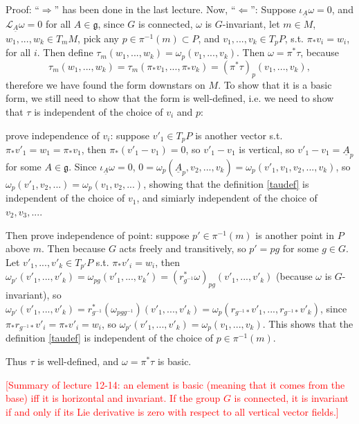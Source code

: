 \documentclass{article}
\theoremstyle{mystyle}
\theoremstyle{remark}
\numberwithin{equation}{section}
\begin{document}
Proof: ``$\Rightarrow$'' has been done in the last lecture. Now, ``$\Leftarrow$'': Suppose $\iota_{\underline{A}} \omega =0$, and $\mathcal{L}_{\underline{A}}\omega =0$ for all $A\in \mathfrak{g}$, since $G$ is connected, $\omega$ is $G$-invariant, let $m\in M$, $w_1,...,w_k \in T_mM$, pick any $p\in \pi^{-1}(m)\subset P$, and $v_1,...,v_k \in T_pP$, s.t. $\pi_*v_i = w_i$, for all $i$. Then define $\tau_m(w_1,...,w_k) =  \omega_p(v_1,...,v_k)$. Then $\omega = \pi^* \tau$, because 
\begin{equation}\label{taudef}
\tau_m(w_1,...,w_k) = \tau_m(\pi_*v_1,...,\pi_*v_k) = (\pi^*\tau)_p(v_1,...,v_k),
\end{equation}
therefore we have found the form downstars on $M$. To show that it is a basic form, we still need to show that the form is well-defined, i.e. we need to show that $\tau$ is independent of the choice of $v_i$ and $p$:

prove independence of $v_i$: suppose $v'_1 \in T_pP$ is another vector s.t. $\pi_*v'_1 = w_1 = \pi_*v_1$, then $ \pi_*(v'_1 - v_1) =0 $, so $v'_ 1-v_1$ is vertical, so $v'_1 - v_1 = \underline{A}_p$ for some $A \in \mathfrak{g}$. Since $\iota_{\underline{A}}\omega =0$, $0 = \omega_p(\underline{A}_p,v_2,...,v_k) = \omega_p(v'_1,v_1,v_2,...,v_k)$, so $\omega_p(v'_1,v_2,...) = \omega_p(v_1,v_2,...)$, showing that the definition \eqref{taudef} is independent of the choice of $v_1$, and simiarly independent of the choice of $v_2,v_3,...$.

Then prove independence of point: suppose $p'\in \pi^{-1}(m)$ is another point in $P$ above $m$. Then because $G$ acts freely and transitively, so $p' = pg$ for some $g\in G$. Let $v'_1,...,v'_k \in T_{p'}P$ s.t. $\pi_*v'_i = w_i$, then $\omega_{p'}(v'_1,...,v'_k) = \omega_{pg}(v'_1,...,v_k') = (r^*_{g^{-1}}\omega)_{pg}(v'_1,...,v'_k)$ (because $\omega$ is $G$-invariant), so $ \omega_{p'}(v'_1,...,v'_k)= r^*_{g^{-1}}(\omega_{pgg^{-1}})(v'_1,...,v'_k)
=\omega_p(r_{g^{-1}*}v'_1,...,r_{g^{-1}*}v'_k)$, since $\pi_*r_{g^{-1}*} v'_i = \pi_*v'_i = w_i$, so $\omega_{p'}(v'_1,...,v'_k) = \omega_p (v_1,...,v_k)$. This shows that the definition \eqref{taudef} is independent of the choice of $p \in \pi^{-1}(m)$. 
 
Thus $\tau$ is well-defined, and $\omega = \pi^*\tau$ is basic.



\textcolor{red}{[Summary of lecture 12-14: an element is basic (meaning that it comes from the base) iff it is horizontal and invariant. If the group $G$ is connected, it is invariant if and only if its Lie derivative is zero with respect to all vertical vector fields.]}
\end{document}
